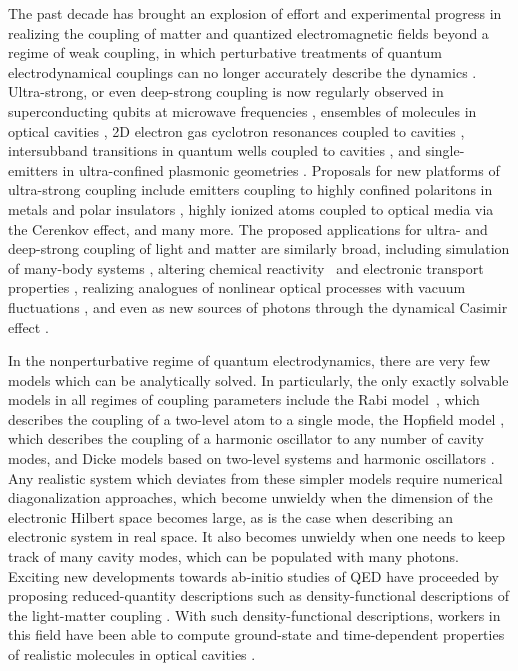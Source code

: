 \documentclass[aps,prb,twocolumn,
	groupedaddress,superscriptaddress,
	amsfonts,amssymb,amsmath,floatfix,
	citeautoscript]{revtex4-1}
\begin{document}
The past decade has brought an explosion of effort and experimental progress in realizing the coupling of matter and quantized electromagnetic fields beyond a regime of weak coupling, in which perturbative treatments of quantum electrodynamical couplings can no longer accurately describe the dynamics \cite{flick7strong,ruggenthaler2017b,forn2018ultrastrong,kockum2018ultrastrong}. Ultra-strong, or even deep-strong coupling is now regularly observed in superconducting qubits at microwave frequencies \cite{blais2004,wallraff2004,yoshihara2017superconducting,forn2017ultrastrong}, ensembles of molecules in optical cavities \cite{hutchison2012,hutchison2013,coles2014,coles2014b,shalabney2015coherent, thomas2016,ebbesen2016}, 2D electron gas cyclotron resonances coupled to cavities \cite{hagenmuller2010ultrastrong,scalari2012ultrastrong,zhang2016collective}, intersubband transitions in quantum wells coupled to cavities \cite{todorov2010ultrastrong,geiser2012ultrastrong}, and single-emitters in ultra-confined plasmonic geometries \cite{benz2016,chikkaraddy2016}. Proposals for new platforms of ultra-strong coupling include emitters coupling to highly confined polaritons in metals and polar insulators \cite{rivera2016shrinking}, highly ionized atoms coupled to optical media via the Cerenkov effect, and many more. The proposed applications for ultra- and deep-strong coupling of light and matter are similarly broad, including simulation of many-body systems \cite{forn2018ultrastrong}, altering chemical reactivity~\cite{hutchison2012, thomas2016,flick2017} and electronic transport properties \cite{orgiu2015}, realizing analogues of nonlinear optical processes with vacuum fluctuations \cite{kockum2017deterministic}, and even as new sources of photons through the dynamical Casimir effect \cite{ciuti2005quantum}.

In the nonperturbative regime of quantum electrodynamics, there are very few models which can be analytically solved. In particularly, the only exactly solvable models in all regimes of coupling parameters include the Rabi model~\cite{braak2011}, which describes the coupling of a two-level atom to a single mode, the Hopfield model \cite{hopfield1958theory}, which describes the coupling of a harmonic oscillator to any number of cavity modes, and Dicke models based on two-level systems and harmonic oscillators \cite{dicke1954coherence}. Any realistic system which deviates from these simpler models require numerical diagonalization approaches, which become unwieldy when the dimension of the electronic Hilbert space becomes large, as is the case when describing an electronic system in real space. It also becomes unwieldy when one needs to keep track of many cavity modes, which can be populated with many photons. Exciting new developments towards ab-initio studies of QED have proceeded by proposing reduced-quantity descriptions such as density-functional descriptions of the light-matter coupling \cite{ruggenthaler2014,pellegrini2015,flick2015,dimitrov2017,flick2018,flick2018b,schaefer2018}. With such density-functional descriptions, workers in this field have been able to compute ground-state and time-dependent properties of realistic molecules in optical cavities \cite{flick2017c}. 
\end{document}
